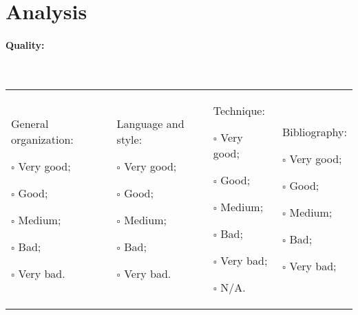 \documentclass[11pt]{article}
\begin{document}
\section{Analysis}

\paragraph{Quality:} ~\newline
\begin{tabular}{p{}p{}p{}p{}}
\begin{minipage}[t]{.25\textwidth}
General organization:
\begin{description}
\item $\square$ Very good;
\item $\square$ Good;
\item $\square$ Medium;
\item $\square$ Bad;
\item $\square$ Very bad.
\end{description}
\end{minipage}

&

\begin{minipage}[t]{.25\textwidth}
Language and style:
\begin{description}
\item $\square$ Very good;
\item $\square$ Good;
\item $\square$ Medium;
\item $\square$ Bad;
\item $\square$ Very bad.
\end{description}
\end{minipage}

&

\begin{minipage}[t]{.25\textwidth}
Technique:
\begin{description}
\item $\square$ Very good;
\item $\square$ Good;
\item $\square$ Medium;
\item $\square$ Bad;
\item $\square$ Very bad;
\item $\square$ N/A.
\end{description}
\end{minipage}

&

\begin{minipage}[t]{.25\textwidth}
Bibliography:
\begin{description}
\item $\square$ Very good;
\item $\square$ Good;
\item $\square$ Medium;
\item $\square$ Bad;
\item $\square$ Very bad;
\end{description}
\end{minipage}
\end{tabular}
\end{document}
